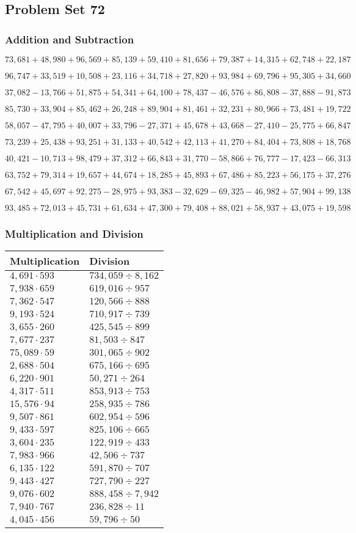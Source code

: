 \hypertarget{problem-set-72}{%
\subsection{Problem Set 72}\label{problem-set-72}}

\hypertarget{addition-and-subtraction-294}{%
\subsubsection{Addition and
Subtraction}\label{addition-and-subtraction-294}}

\(73,681+48,980+96,569+85,139+59,410+81,656+79,387+14,315+62,748+ 22,187\)

\(96,747+33,519+10,508+23,116+34,718+27,820+93,984+69,796+95,305+34,660\)

\(37,082-13,766+51,875+54,341+64,100+78,437-46,576+86,808-37,888-91,873\)

\(85,730+33,904+85,462+26,248+89,904+81,461+32,231+80,966+73,481+19,722\)

\(58,057-47,795+40,007+33,796-27,371+45,678+43,668-27,410-25,775+66,847\)

\(73,239+25,438+93,251+31,133+40,542+42,113+41,270+84,404+73,808+18,768\)

\(40,421-10,713+98,479+37,312+66,843+31,770-58,866+76,777-17,423-66,313\)

\(63,752+79,314+19,657+44,674+18,285+45,893+67,486+85,223+56,175+37,276\)

\(67,542+45,697+92,275-28,975+93,383-32,629-69,325-46,982+57,904+99,138\)

\(93,485+72,013+45,731+61,634+47,300+79,408+88,021+58,937+43,075+19,598\)

\hypertarget{multiplication-and-division-293}{%
\subsubsection{Multiplication and
Division}\label{multiplication-and-division-293}}

\begin{longtable}[]{@{}ll@{}}
\toprule
Multiplication & Division\tabularnewline
\midrule
\endhead
\(4,691\cdot593\) & \(734,059÷8,162\)\tabularnewline
\(7,938\cdot659\) & \(619,016÷957\)\tabularnewline
\(7,362\cdot547\) & \(120,566÷888\)\tabularnewline
\(9,193\cdot524\) & \(710,917÷739\)\tabularnewline
\(3,655\cdot260\) & \(425,545÷899\)\tabularnewline
\(7,677\cdot237\) & \(81,503÷847\)\tabularnewline
\(75,089\cdot59\) & \(301,065÷902\)\tabularnewline
\(2,688\cdot504\) & \(675,166÷695\)\tabularnewline
\(6,220\cdot901\) & \(50,271÷264\)\tabularnewline
\(4,317\cdot511\) & \(853,913÷753\)\tabularnewline
\(15,576\cdot94\) & \(258,935÷786\)\tabularnewline
\(9,507\cdot861\) & \(602,954÷596\)\tabularnewline
\(9,433\cdot597\) & \(825,106÷665\)\tabularnewline
\(3,604\cdot235\) & \(122,919÷433\)\tabularnewline
\(7,983\cdot966\) & \(42,506÷737\)\tabularnewline
\(6,135\cdot122\) & \(591,870÷707\)\tabularnewline
\(9,443\cdot427\) & \(727,790÷227\)\tabularnewline
\(9,076\cdot602\) & \(888,458÷7,942\)\tabularnewline
\(7,940\cdot767\) & \(236,828÷11\)\tabularnewline
\(4,045\cdot456\) & \(59,796÷50\)\tabularnewline
\bottomrule
\end{longtable}

